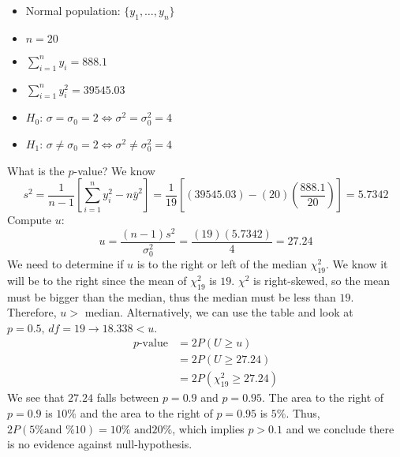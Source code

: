\begin{exbox}
    \begin{example}\label{small u variance} $ \; $
        \begin{itemize}
            \item Normal population: $ \{y_1,\ldots ,y_n\} $
            \item $ n=20 $
            \item $ \sum\limits_{i=1}^{n} y_i=888.1 $
            \item $ \sum\limits_{i=1}^{n} y_i^2=39545.03 $
            \item $ H_0 $: $ \sigma=\sigma_0=2 \iff \sigma^2=\sigma_0^2=4 $
            \item $ H_1 $: $ \sigma\neq \sigma_0=2 \iff \sigma^2\neq \sigma_0^2=4 $
        \end{itemize}
        What is the $ p $-value?
        We know
        \[ s^2=\frac{1}{n-1} \left[ \sum\limits_{i=1}^{n} y_i^2-n\bar{y}^2 \right]
            =
            \frac{1}{19} \left[ (39545.03)-(20)\left( \frac{888.1}{20}  \right)  \right]
            =
            5.7342 \]
        Compute $ u $:
        \[ u=\frac{(n-1)s^2}{\sigma_0^2}
            =
            \frac{(19)(5.7342)}{4}
            =
            27.24 \]
        We need to determine if $ u $ is to the right or left of the median $ \chi^2_{19} $.
        We know it will be to the right since the mean of $ \chi^2_{19} $ is $ 19 $.
        $ \chi^2 $ is right-skewed, so the mean must be bigger than the median,
        thus the median must be less than $ 19 $. Therefore, $ u> $ median. Alternatively,
        we can use the table and look at $ p=0.5,\,df=19\rightarrow 18.338<u $.
        \begin{align*}
            p\text{-value}
             & =2P(U\geqslant u)               \\
             & =2P(U\geqslant 27.24)           \\
             & =2P(\chi^2_{19}\geqslant 27.24)
        \end{align*}
        We see that $ 27.24 $ falls between $ p=0.9 $ and $ p=0.95 $. The area to the right of
        $ p=0.9 $ is $ 10\% $ and the area to the right of $ p=0.95 $ is $ 5\% $.
        Thus, $ 2P(5\%\text{and }\% 10)=10\%\text{ and} 20\% $,
        which implies $ p>0.1 $ and we conclude there is no evidence against null-hypothesis.
    \end{example}
\end{exbox}
